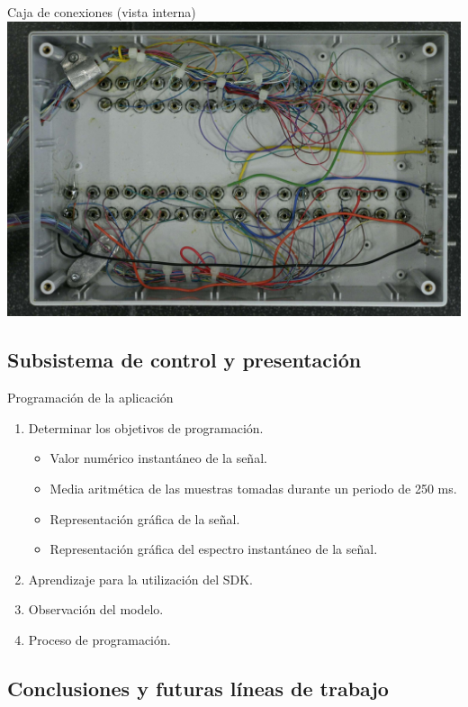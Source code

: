 \documentclass[utf8, compress]			{beamer}
\begin{document}
\begin{frame}{Caja de conexiones (vista interna)}
    \includegraphics{interior.jpg}
\end{frame}


\subsection{Subsistema de control y presentación}

\begin{frame}{Programación de la aplicación}
    \begin{enumerate}
	\item Determinar los objetivos de programación.
	    \begin{itemize}
		\item Valor numérico instantáneo de la señal.
		\item Media aritmética de las muestras tomadas durante un
		    periodo de 250 ms.
		\item Representación gráfica de la señal.
		\item Representación gráfica del espectro instantáneo de la
		    señal.
	    \end{itemize}
	\item Aprendizaje para la utilización del SDK.
	\item Observación del modelo.
	\item Proceso de programación.
    \end{enumerate}
\end{frame}


\subsection{Conclusiones y futuras líneas de trabajo}
\end{document}

